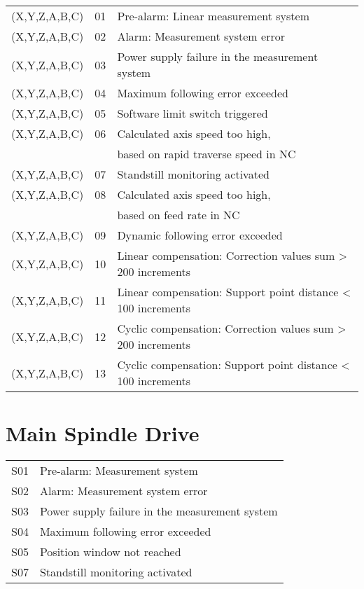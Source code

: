 \documentclass[openany,11pt]{book}
\begin{document}
\begin{table}[h]
    \begin{tabular}{lll}
    (X,Y,Z,A,B,C) & 01 & Pre-alarm: Linear measurement system \\
    (X,Y,Z,A,B,C) & 02 & Alarm: Measurement system error \\
    (X,Y,Z,A,B,C) & 03 & Power supply failure in the measurement system \\
    (X,Y,Z,A,B,C) & 04 & Maximum following error exceeded \\
    (X,Y,Z,A,B,C) & 05 & Software limit switch triggered \\
    (X,Y,Z,A,B,C) & 06 & Calculated axis speed too high, \\
                     &    & based on rapid traverse speed in NC \\
    (X,Y,Z,A,B,C) & 07 & Standstill monitoring activated \\
    (X,Y,Z,A,B,C) & 08 & Calculated axis speed too high, \\
                     &    & based on feed rate in NC \\
    (X,Y,Z,A,B,C) & 09 & Dynamic following error exceeded \\
    (X,Y,Z,A,B,C) & 10 & Linear compensation: Correction values sum > 200 increments \\
    (X,Y,Z,A,B,C) & 11 & Linear compensation: Support point distance < 100 increments \\
    (X,Y,Z,A,B,C) & 12 & Cyclic compensation: Correction values sum > 200 increments \\
    (X,Y,Z,A,B,C) & 13 & Cyclic compensation: Support point distance < 100 increments \\
    \end{tabular}
\end{table}

\FloatBarrier 

\section*{Main Spindle Drive}

\begin{table}[!h]
    \begin{tabular}{ll}
    S01 & Pre-alarm: Measurement system \\
    S02 & Alarm: Measurement system error \\
    S03 & Power supply failure in the measurement system \\
    S04 & Maximum following error exceeded \\
    S05 & Position window not reached \\
    S07 & Standstill monitoring activated \\
    \end{tabular}
\end{table}
\end{document}
